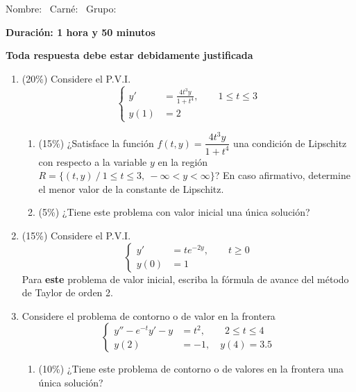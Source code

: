 \documentclass[11pt]{article}
\begin{document}
\examheader

\vspace{4pt}
\noindent Nombre: \dotfill\ Carné: \dotfill\ Grupo: \dotfill

\vspace{8pt}
\noindent\textbf{Duración: 1 hora y 50 minutos}

\begin{center}\textbf{Toda respuesta debe estar debidamente justificada}\end{center}

\begin{enumerate}
\item{} (20\%) Considere el P.V.I.
\[
\left\{
\begin{aligned}
y' &= \frac{4t^3y}{1+t^4}, \qquad 1\leq t\leq 3\\
y(1) &= 2
\end{aligned}
\right.
\]
\begin{enumerate}
\item{} (15\%) ¿Satisface la función $f(t,y)=\dfrac{4t^3y}{1+t^4}$ una condición de Lipschitz con respecto a la variable $y$ en la región $R=\{(t,y)\ /\ 1\leq t\leq 3,\ -\infty<y<\infty\}$? En caso afirmativo, determine el menor valor de la constante de Lipschitz.

\vspace{4cm}

\item{} (5\%) ¿Tiene este problema con valor inicial una única solución?

\vspace{2cm}
\end{enumerate}

\item{} (15\%) Considere el P.V.I.
\[
\left\{
\begin{aligned}
y' &= te^{-2y}, \qquad t\geq 0\\
y(0) &= 1
\end{aligned}
\right.
\]
\noindent Para \textbf{este} problema de valor inicial, escriba la fórmula de avance del método de Taylor de orden 2.

\vspace{5cm}

\item{} Considere el problema de contorno o de valor en la frontera
\[
\left\{
\begin{aligned}
y''-e^{-t}y'-y &= t^2, \qquad 2\leq t\leq 4\\
y(2) &= -1,\quad y(4)=3.5
\end{aligned}
\right.
\]
\begin{enumerate}
\item{} (10\%) ¿Tiene este problema de contorno o de valores en la frontera una única solución?


\end{enumerate}
\end{enumerate}
\end{document}

